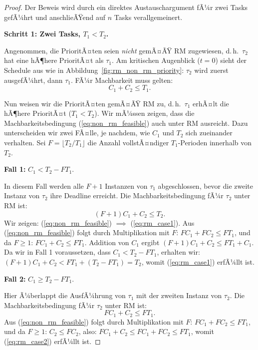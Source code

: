 ﻿\documentclass[a4paper,12pt]{report}
\theoremstyle{definition}
\begin{document}
\begin{proof}
	Der Beweis wird durch ein direktes Austauschargument fÃ¼r zwei Tasks gefÃ¼hrt
	und anschlieÃŸend auf $n$ Tasks verallgemeinert.

	\textbf{Schritt 1: Zwei Tasks, $T_1 < T_2$.}

	Angenommen, die PrioritÃ¤ten seien \emph{nicht} gemÃ¤ÃŸ RM zugewiesen, d.\,h.\
	$\tau_2$ hat eine hÃ¶here PrioritÃ¤t als $\tau_1$. Am kritischen Augenblick
	($t = 0$) sieht der Schedule aus wie in Abbildung~\ref{fig:rm_non_rm_priority}:
	$\tau_2$ wird zuerst ausgefÃ¼hrt, dann $\tau_1$. FÃ¼r Machbarkeit muss gelten:
	\begin{equation}
		C_1 + C_2 \leq T_1.
		\label{eq:non_rm_feasible}
	\end{equation}

	Nun weisen wir die PrioritÃ¤ten gemÃ¤ÃŸ RM zu, d.\,h.\ $\tau_1$ erhÃ¤lt die hÃ¶here
	PrioritÃ¤t ($T_1 < T_2$). Wir mÃ¼ssen zeigen, dass die Machbarkeitsbedingung
	(\ref{eq:non_rm_feasible}) auch unter RM ausreicht. Dazu unterscheiden wir
	zwei FÃ¤lle, je nachdem, wie $C_1$ und $T_2$ sich zueinander verhalten. Sei
	$F = \lfloor T_2 / T_1 \rfloor$ die Anzahl vollstÃ¤ndiger $T_1$-Perioden
	innerhalb von $T_2$.

	\textbf{Fall 1:} $C_1 < T_2 - F T_1$.

	In diesem Fall werden alle $F+1$ Instanzen von $\tau_1$ abgeschlossen, bevor
	die zweite Instanz von $\tau_2$ ihre Deadline erreicht. Die Machbarkeitsbedingung
	fÃ¼r $\tau_2$ unter RM ist:
	\begin{equation}
		(F+1)C_1 + C_2 \leq T_2.
		\label{eq:rm_case1}
	\end{equation}
	Wir zeigen: (\ref{eq:non_rm_feasible}) $\implies$ (\ref{eq:rm_case1}). Aus
	(\ref{eq:non_rm_feasible}) folgt durch Multiplikation mit $F$:
	$F C_1 + F C_2 \leq F T_1$, und da $F \geq 1$:
	$F C_1 + C_2 \leq F T_1$.
	Addition von $C_1$ ergibt $(F+1)C_1 + C_2 \leq F T_1 + C_1$.
	Da wir in Fall 1 voraussetzen, dass $C_1 < T_2 - F T_1$, erhalten wir:
	$(F+1)C_1 + C_2 < F T_1 + (T_2 - F T_1) = T_2$,
	womit (\ref{eq:rm_case1}) erfÃ¼llt ist.

	\textbf{Fall 2:} $C_1 \geq T_2 - F T_1$.

	Hier Ã¼berlappt die AusfÃ¼hrung von $\tau_1$ mit der zweiten Instanz von $\tau_2$.
	Die Machbarkeitsbedingung fÃ¼r $\tau_2$ unter RM ist:
	\begin{equation}
		F C_1 + C_2 \leq F T_1.
		\label{eq:rm_case2}
	\end{equation}
	Aus (\ref{eq:non_rm_feasible}) folgt durch Multiplikation mit $F$:
	$F C_1 + F C_2 \leq F T_1$, und da $F \geq 1$: $C_2 \leq F C_2$, also:
	$F C_1 + C_2 \leq F C_1 + F C_2 \leq F T_1$,
	womit (\ref{eq:rm_case2}) erfÃ¼llt ist.


\end{proof}
\end{document}
